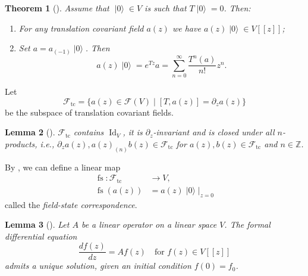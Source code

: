 \documentclass[a4paper, 12pt, reqno]{amsart}
\newtheorem{theorem}{Theorem}[section]
\newtheorem{lemma}[theorem]{Lemma}
\theoremstyle{remark}
\numberwithin{equation}{subsection}
\DeclareMathOperator{\Id}{Id}
\DeclareMathOperator{\vac}{|0\rangle}
\DeclareMathOperator{\fs}{fs}
\DeclareMathOperator{\tc}{tc}
\begin{document}
\begin{theorem}[{\cite[Lemma 1]{callegaro_introduction_2017}}]
  \label{thr:14}
  Assume that $\vac \in V$ is such that $T\vac = 0$.
  Then:
  \begin{enumerate}
  \item For any translation covariant field $a(z)$ we have $a(z)\vac \in V[[z]]$;
  \item Set $a = a_{(-1)}\vac$.
    Then
    \begin{equation*}
      a(z)\vac = e^{Tz}a = \sum_{n = 0}^{\infty}\frac{T^n(a)}{n!}z^n.
    \end{equation*}
  \end{enumerate}
\end{theorem}

Let
\begin{equation*}
  \mathcal{F}_{\tc} = \{a(z) \in \mathcal{F}(V) \mid [T, a(z)] = \partial_za(z)\}
\end{equation*}
be the subspace of translation covariant fields.

\begin{lemma}[{\cite[Lemma 3]{callegaro_introduction_2017}}]
  \label{lmm:5}
  $\mathcal{F}_{\tc}$ contains $\Id_V$, it is $\partial_z$-invariant and is closed under all $n$-products, i.e., $\partial_za(z), a(z)_{(n)}b(z) \in \mathcal{F}_{\tc}$ for $a(z), b(z) \in \mathcal{F}_{\tc}$ and $n \in \mathbb{Z}$.
\end{lemma}

By , we can define a linear map
\begin{align*}
  \fs: \mathcal{F}_{\tc} &\to V, \\
  \fs(a(z)) &= a(z)\vac|_{z = 0}
\end{align*}
called the \emph{field-state correspondence}.

\begin{lemma}[{\cite[Proposition 4.3.2]{nozaradan_introduction_2008}}]
  \label{lmm:6}
  Let $A$ be a linear operator on a linear space $V$.
  The formal differential equation
  \begin{equation*}
    \frac{df(z)}{dz} = Af(z) \quad \text{for }f(z) \in V[[z]]
  \end{equation*}
  admits a unique solution, given an initial condition $f(0) = f_0$.
\end{lemma}
\end{document}
